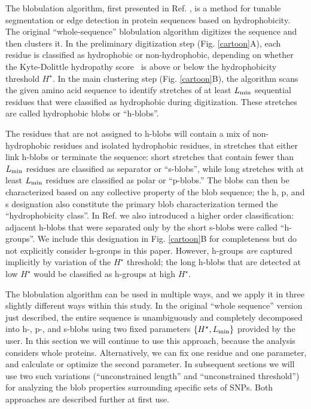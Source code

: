 \documentclass[9pt,twocolumn,twoside,lineno]{pnas-new}
\newcommand{\aucomment}[1]{}
\newcommand{\inserted}[1]{{#1}}
\newcommand{\hydrochar}{hydrophobicity class}
\newcommand{\Ht}{H^{\star}}
\newcommand{\Lmin}{L_{\rm min}}
\begin{document}
\aucomment{This subsection is entirely new.}
\inserted{The blobulation algorithm, first presented in Ref. \cite{Lohia2019}, is a method for tunable segmentation or edge detection in protein sequences based on hydrophobicity. The original ``whole-sequence'' blobulation algorithm digitizes the sequence and then clusters it. In the preliminary digitization step (Fig. \ref{cartoon}A), each residue is classified as hydrophobic or non-hydrophobic, depending on whether the Kyte-Dolittle hydropathy score~\cite{Kyte1982} is above or below the hydrophobicity threshold $\Ht$. In the main clustering step (Fig. \ref{cartoon}B),  the algorithm scans the given amino acid sequence to identify stretches of at least $\Lmin$ sequential residues that were classified as hydrophobic during digitization. These stretches are called hydrophobic blobs or ``h-blobs''. }

\inserted{The residues that are not assigned to h-blobs will contain a mix of non-hydrophobic residues and isolated hydrophobic residues, in stretches that either link h-blobs or terminate the sequence: short stretches that contain fewer than $\Lmin$ residues are classified as separator or ``s-blobs'', while long stretches with at least $\Lmin$ residues are classified as polar or ``p-blobs.'' The blobs can then be characterized based on any collective property of the blob sequence; the h, p, and s designation also constitute the primary blob characterization termed the ``\hydrochar''. In Ref. \cite{Lohia2019} we also introduced a higher order classification: adjacent h-blobs that were separated only by the short s-blobs were called ``h-groups''. We include this designation in Fig. \ref{cartoon}B for completeness but do not explicitly consider h-groups in this paper. However, h-groups \emph{are} captured implicitly by variation of the $\Ht$ threshold; the long h-blobs that are detected at low $\Ht$ would be classified as h-groups at high $\Ht$.} 

\inserted{The blobulation algorithm can be used in multiple ways, and we apply it in three slightly different ways within this study. In the original ``whole sequence'' version just described, the entire sequence is unambiguously and completely decomposed into h-, p-, and s-blobs using two fixed parameters $\{\Ht,\Lmin\}$ provided by the user.  In this section we will continue to use this approach, because the analysis considers whole proteins. Alternatively, we can fix one residue and one parameter, and calculate or optimize the second parameter. In subsequent sections we will use two such variations (``unconstrained length'' and ``unconstrained threshold'') for analyzing the blob properties surrounding specific sets of SNPs. Both approaches are described further at first use. }
\end{document}
